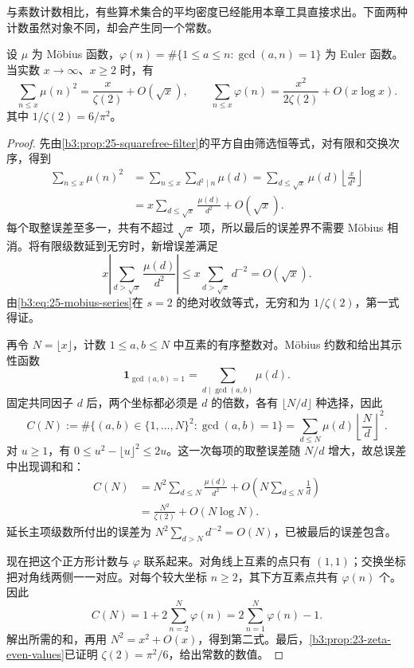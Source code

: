 与素数计数相比，有些算术集合的平均密度已经能用本章工具直接求出。下面两种计数虽然对象不同，却会产生同一个常数。

\begin{proposition}[平方自由整数与互素整数对的密度]
\label{b3:prop:25-two-densities}
设 \(\mu\) 为 Möbius 函数，\(\varphi(n)=\#\{1\le a\le n:\gcd(a,n)=1\}\) 为 Euler 函数。当实数 \(x\to\infty\)、\(x\ge2\) 时，有
\[
 \sum_{n\le x}\mu(n)^2=\frac{x}{\zeta(2)}+O(\sqrt x),
 \qquad
 \sum_{n\le x}\varphi(n)=\frac{x^2}{2\zeta(2)}+O(x\log x).
\]
其中 \(1/\zeta(2)=6/\pi^2\)。
\end{proposition}
\begin{proof}
先由\cref{b3:prop:25-squarefree-filter}的平方自由筛选恒等式，对有限和交换次序，得到
\[
 \begin{aligned}
 \sum_{n\le x}\mu(n)^2
 &=\sum_{n\le x}\sum_{d^2\mid n}\mu(d)
 =\sum_{d\le\sqrt x}\mu(d)\left\lfloor\frac{x}{d^2}\right\rfloor\\
 &=x\sum_{d\le\sqrt x}\frac{\mu(d)}{d^2}+O(\sqrt x).
 \end{aligned}
\]
每个取整误差至多一，共有不超过 \(\sqrt x\) 项，所以最后的误差界不需要 Möbius 相消。将有限级数延到无穷时，新增误差满足
\[
 x\left|\sum_{d>\sqrt x}\frac{\mu(d)}{d^2}\right|
 \le x\sum_{d>\sqrt x}d^{-2}=O(\sqrt x).
\]
由\eqref{b3:eq:25-mobius-series}在 \(s=2\) 的绝对收敛等式，无穷和为 \(1/\zeta(2)\)，第一式得证。

再令 \(N=\lfloor x\rfloor\)，计数 \(1\le a,b\le N\) 中互素的有序整数对。Möbius 约数和给出其示性函数
\[
 \mathbf1_{\gcd(a,b)=1}=\sum_{d\mid\gcd(a,b)}\mu(d).
\]
固定共同因子 \(d\) 后，两个坐标都必须是 \(d\) 的倍数，各有 \(\lfloor N/d\rfloor\) 种选择，因此
\[
 C(N):=\#\{(a,b)\in\{1,\ldots,N\}^2:\gcd(a,b)=1\}
 =\sum_{d\le N}\mu(d)\left\lfloor\frac Nd\right\rfloor^2.
\]
对 \(u\ge1\)，有 \(0\le u^2-\lfloor u\rfloor^2\le2u\)。这一次每项的取整误差随 \(N/d\) 增大，故总误差中出现调和和：
\[
 \begin{aligned}
 C(N)
 &=N^2\sum_{d\le N}\frac{\mu(d)}{d^2}
       +O\left(N\sum_{d\le N}\frac1d\right)\\
 &=\frac{N^2}{\zeta(2)}+O(N\log N).
 \end{aligned}
\]
延长主项级数所付出的误差为 \(N^2\sum_{d>N}d^{-2}=O(N)\)，已被最后的误差包含。

现在把这个正方形计数与 \(\varphi\) 联系起来。对角线上互素的点只有 \((1,1)\)；交换坐标把对角线两侧一一对应。对每个较大坐标 \(n\ge2\)，其下方互素点共有 \(\varphi(n)\) 个。因此
\[
 C(N)=1+2\sum_{n=2}^N\varphi(n)
     =2\sum_{n=1}^N\varphi(n)-1.
\]
解出所需的和，再用 \(N^2=x^2+O(x)\)，得到第二式。最后，\cref{b3:prop:23-zeta-even-values}已证明 \(\zeta(2)=\pi^2/6\)，给出常数的数值。
\end{proof}


